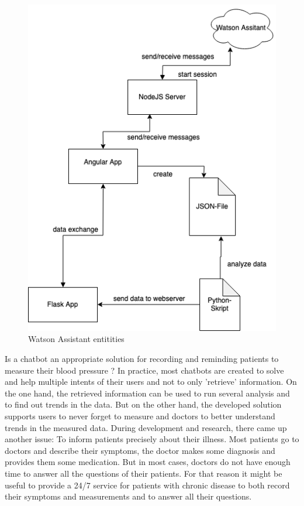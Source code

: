 \begin{figure}[h]
	\centering
	\includegraphics[width=1\textwidth]{images/architecture_perfectworld.png}
	\caption{Watson Assistant entitities}
	\label{architecture_perfect}
\end{figure}

Is a chatbot an appropriate solution for recording and reminding patients to measure their blood pressure ? 
In practice, most chatbots are created to solve and help multiple intents of their users and not to only 'retrieve' information.
On the one hand, the retrieved information can be used to run several analysis and to find out trends in the data. But on the other hand, the developed solution  supports users to never forget to measure and doctors to better understand trends in the measured data.
During development and research, there came up another issue: To inform patients precisely about their illness. Most patients go to doctors and describe their symptoms, the doctor makes some diagnosis and provides them some medication. But in most cases, doctors do not have enough time to answer all the questions of their patients. For that reason it might be useful to provide a 24/7 service for patients with chronic disease to both record their symptoms and measurements and to answer all their questions.


